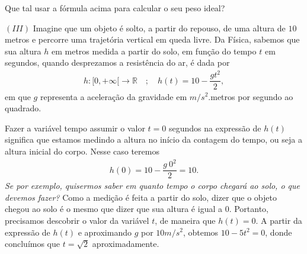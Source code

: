 \documentclass[extrafontsizes, twoside, 11pt, openright, final]{memoir}
\begin{document}
Que tal usar a fórmula acima para calcular o seu peso ideal?

$(III)$ Imagine que um objeto é solto, a partir do repouso, de uma altura de $10$ metros e percorre uma trajetória vertical em queda livre. Da Física, sabemos que sua altura $h$ em metros medida a partir do solo, em função do tempo $t$ em segundos, quando desprezamos a resistência do ar, é dada por
\begin{equation*}
	\begin{split}h:[0,+\infty[\to \mathbb{R}\quad ; \quad h(t)=10-\dfrac{gt^2}{2},\end{split}
\end{equation*}
em que $g$ representa a aceleração da gravidade em $m/s^2$.metros por segundo ao quadrado.

Fazer a variável tempo assumir o valor $t=0$ segundos na expressão de $h(t)$ significa que estamos medindo a altura no início da contagem do tempo, ou seja a altura inicial do corpo. Nesse caso teremos
\begin{equation*}
	\begin{split}h(0)=10-\dfrac{g\ 0^2}{2}=10.\end{split}
\end{equation*}
\emph{Se por exemplo, quisermos saber em quanto tempo o corpo chegará ao solo, o que devemos fazer?} Como a medição é feita a partir do solo, dizer que o objeto chegou ao solo é o mesmo que dizer que sua altura é igual a 0. Portanto, precisamos descobrir o valor da variável $t$, de maneira que $h(t)=0$. A partir da expressão de $h(t)$ e aproximando $g$ por $10 m/s^2$, obtemos $10-5t^2=0$, donde concluímos que  $t=\sqrt{2}$ aproximadamente.
\end{document}
